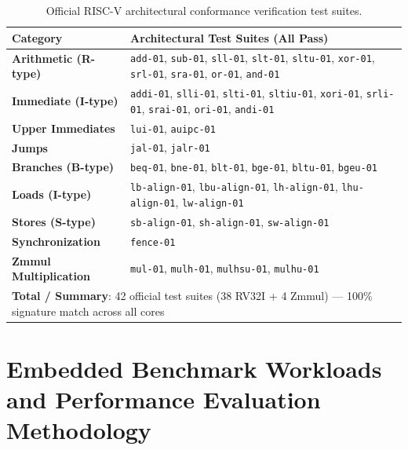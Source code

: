 \begin{table}[htbp]
\centering
\small
\begin{tabularx}{\textwidth}{|l|X|}
\hline
\textbf{Category} & \textbf{Architectural Test Suites (All Pass)} \\
\hline
\textbf{Arithmetic (R-type)} & \texttt{add-01}, \texttt{sub-01}, \texttt{sll-01}, \texttt{slt-01}, \texttt{sltu-01}, \texttt{xor-01}, \texttt{srl-01}, \texttt{sra-01}, \texttt{or-01}, \texttt{and-01} \\
\hline
\textbf{Immediate (I-type)}  & \texttt{addi-01}, \texttt{slli-01}, \texttt{slti-01}, \texttt{sltiu-01}, \texttt{xori-01}, \texttt{srli-01}, \texttt{srai-01}, \texttt{ori-01}, \texttt{andi-01} \\
\hline
\textbf{Upper Immediates}     & \texttt{lui-01}, \texttt{auipc-01} \\
\hline
\textbf{Jumps}               & \texttt{jal-01}, \texttt{jalr-01} \\
\hline
\textbf{Branches (B-type)}   & \texttt{beq-01}, \texttt{bne-01}, \texttt{blt-01}, \texttt{bge-01}, \texttt{bltu-01}, \texttt{bgeu-01} \\
\hline
\textbf{Loads (I-type)}      & \texttt{lb-align-01}, \texttt{lbu-align-01}, \texttt{lh-align-01}, \texttt{lhu-align-01}, \texttt{lw-align-01} \\
\hline
\textbf{Stores (S-type)}     & \texttt{sb-align-01}, \texttt{sh-align-01}, \texttt{sw-align-01} \\
\hline
\textbf{Synchronization}     & \texttt{fence-01} \\
\hline
\textbf{Zmmul Multiplication}& \texttt{mul-01}, \texttt{mulh-01}, \texttt{mulhsu-01}, \texttt{mulhu-01} \\
\hline
\multicolumn{2}{|l|}{\textbf{Total / Summary}: 42 official test suites (38 RV32I + 4 Zmmul) --- 100\% signature match across all cores} \\
\hline
\end{tabularx}
\caption{Official RISC-V architectural conformance verification test suites.}\label{tab:conformance_results}
\end{table}


\section{Embedded Benchmark Workloads and Performance Evaluation Methodology}\label{riscvBenchmarks}


